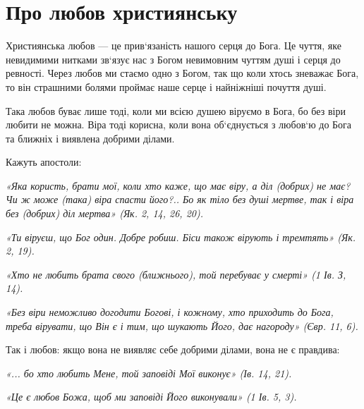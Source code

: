 \documentclass[main.tex]{subfiles}
\begin{document}
\section{Про любов християнську}

Християнська любов — це прив`язаність нашого серця до Бога. Це чуття, яке невидимими нитками зв`язує нас з Богом невимовним чуттям душі і серця до ревності. Через любов ми стаємо одно з Богом, так що коли хтось зневажає Бога, то він страшними болями проймає наше серце і найніжніші почуття душі.

Така любов буває лише тоді, коли ми всією душею віруємо в Бога, бо без віри любити не можна. Віра тоді корисна, коли вона об`єднується з любов`ю до Бога та ближніх і виявлена добрими ділами.

Кажуть апостоли:

\begin{FlushRight}
    \emph{«Яка користь, брати мої, коли хто каже, що має віру, а діл (добрих) не має? Чи ж може (така) віра спасти його?.. Бо як тіло без душі мертве, так і віра без (добрих) діл мертва» (Як. 2, 14, 26, 20).}
\end{FlushRight}

\begin{FlushRight}
    \emph{«Ти віруєш, що Бог один. Добре робиш. Біси також вірують і тремтять» (Як. 2, 19).}
\end{FlushRight}

\begin{FlushRight}
    \emph{«Хто не любить брата свого (ближнього), той перебуває у смерті» (1 Ів. З, 14).}
\end{FlushRight}

\begin{FlushRight}
   \emph{«Без віри неможливо догодити Богові, і кожному, хто приходить до Бога, треба вірувати, що Він є і тим, що шукають Його, дає нагороду» (Євр. 11, 6).} 
\end{FlushRight}

Так і любов: якщо вона не виявляє себе добрими ділами, вона не є правдива:
\begin{FlushRight}
    \emph{}
\end{FlushRight}

\begin{FlushRight}
    \emph{{\color{red} «... бо хто любить Мене, той заповіді Мої виконує»} (Ів. 14, 21).}
\end{FlushRight}

\begin{FlushRight}
    \emph{«Це є любов Божа, щоб ми заповіді Його виконували» (1 Ів. 5, 3).}
\end{FlushRight}
\end{document}
